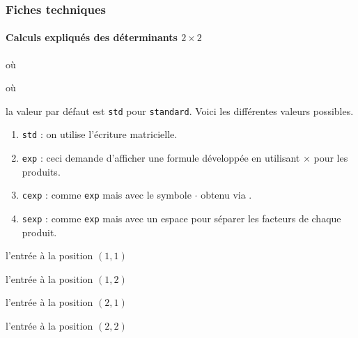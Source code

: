 \documentclass[12pt,a4paper]{article}
\begin{document}


\subsubsection{Fiches techniques}

\paragraph{\texorpdfstring{Calculs expliqués des déterminants $2 \times 2$}%
                          {Calculs expliqués des déterminants 3x3}}

  où \quad {}

  où \quad {}

\IDoption{} la valeur par défaut est \verb+std+ pour \verb+standard+. Voici les différentes valeurs possibles.
\begin{enumerate}
	\item \verb+std+ : on utilise l'écriture matricielle.

	\item \verb+exp+ : ceci demande d'afficher une formule développée en utilisant $\times$ pour les produits.

	\item \verb+cexp+ : comme \verb+exp+ mais avec le symbole $\cdot$ obtenu via .

	\item \verb+sexp+ : comme \verb+exp+ mais avec un espace pour séparer les facteurs de chaque produit.
\end{enumerate}

 l'entrée à la position $(1, 1)$

 l'entrée à la position $(1, 2)$

\extraspace

 l'entrée à la position $(2, 1)$

 l'entrée à la position $(2, 2)$                   
\end{document}
